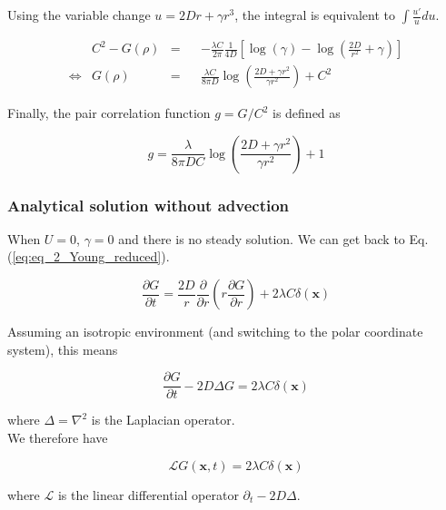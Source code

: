 Using the variable change $u=2Dr+\gamma r^{3}$, the integral is equivalent
to $\int\frac{u'}{u}du$.

\begin{align}
 & C^{2}-G(\rho) & = & & -\frac{\lambda C}{2\pi}\frac{1}{4D}[\log(\gamma)-\log(\frac{2D}{r^{2}}+\gamma)]\label{eq:deriv_G_rint2}\\
\Leftrightarrow & G(\rho) & = & & \frac{\lambda C}{8\pi D}\log\left(\frac{2D+\gamma r^{2}}{\gamma r^{2}}\right)+C^{2}\label{eq:G_rho}
\end{align}

Finally, the pair correlation function $g=G/C^{2}$ is defined as

\begin{equation}
g=\frac{\lambda}{8\pi DC}\log\left(\frac{2D+\gamma r^{2}}{\gamma r^{2}}\right)+1
\end{equation}


\subsubsection*{Analytical solution without advection}

When $U=0$, $\gamma=0$ and there is no steady solution. We can get
back to Eq. (\ref{eq:eq_2_Young_reduced}). 

\begin{equation}
\frac{\partial G}{\partial t}=\frac{2D}{r}\frac{\partial}{\partial r}\left(r\frac{\partial G}{\partial r}\right)+2\lambda C\delta(\boldsymbol{x})\label{eq:g_without_advection}
\end{equation}

Assuming an isotropic environment (and switching to the polar coordinate system), this means

\begin{equation}
\frac{\partial G}{\partial t}-2D\Delta G=2\lambda C\delta(\boldsymbol{x})
\end{equation}

where $\Delta=\nabla^{2}$ is the Laplacian operator. \\

We therefore have 

\begin{equation}
\mathcal{L}G(\boldsymbol{x},t)=2\lambda C\delta(\boldsymbol{x})\label{eq:LG_lambda}
\end{equation}

where $\mathcal{L}$ is the linear differential operator $\partial_{t}-2D\Delta$. \\

